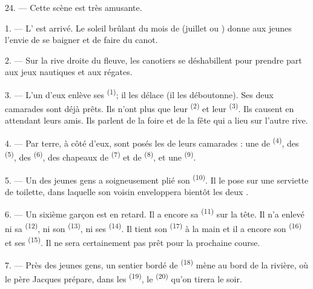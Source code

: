 24. --- Cette scène est très amusante.

\VUsaut{4.0mm}
\VUsaut{3.0mm}

\VUsaut{2.4mm}

\VUsaut{3.0mm}

1. --- L' est arrivé. Le soleil brûlant du mois de 
(juillet ou ) donne aux jeunes l'envie de se baigner et de faire
du canot.

2. --- Sur la rive droite du fleuve, les canotiers se déshabillent pour prendre
part aux jeux nautiques et aux régates.

3. --- L'un d'eux enlève ses  \textsuperscript{(1)}; il les
délace (il les déboutonne). Ses deux camarades sont déjà prêts. Ils n'ont plus
que leur  \textsuperscript{(2)} et leur 
\textsuperscript{(3)}. Ils causent en attendant leurs amis. Ils parlent de la
foire et de la fête qui a lieu sur l'autre rive.

4. --- Par terre, à côté d'eux, sont posés les  de leurs
camarades : une  de  \textsuperscript{(4)}, des
 \textsuperscript{(5)}, des 
\textsuperscript{(6)}, des chapeaux de  \textsuperscript{(7)} et
de  \textsuperscript{(8)}, et une 
\textsuperscript{(9)}.

5. --- Un des jeunes gens a soigneusement plié son 
\textsuperscript{(10)}. Il le pose sur une serviette de toilette, dans laquelle
son voisin enveloppera bientôt les deux .

6. --- Un sixième garçon est en retard. Il a encore sa 
\textsuperscript{(11)} sur la tête. Il n'a enlevé ni sa 
\textsuperscript{(12)}, ni son  \textsuperscript{(13)}, ni ses
 \textsuperscript{(14)}. Il tient son 
\textsuperscript{(17)} à la main et il a encore son 
\textsuperscript{(16)} et ses  \textsuperscript{(15)}. Il ne
sera certainement pas prêt pour la prochaine course.

7. --- Près des jeunes gens, un sentier bordé de 
\textsuperscript{(18)} mène au bord de la rivière, où le père Jacques prépare,
dans les  \textsuperscript{(19)}, le 
\textsuperscript{(20)} qu'on tirera le soir.

